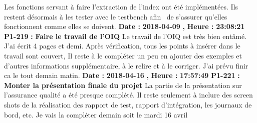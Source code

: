 \documentclass{article}%
\begin{document}
\newline%
%
Les fonctions servant à faire l'extraction de l'index ont été implémentées. Ils restent désormais à les tester avec le testbench afin~ de s'assurer qu'elles fonctionnent comme elles se doivent.\newline%
\newline%
%
\textbf{Date : }%
\textbf{2018{-}04{-}09}%
\textbf{,}%
\textbf{ Heure : }%
\textbf{23:08:21}%
\newline%
%
\textbf{P1{-}219 }%
\textbf{ : }%
\textbf{ Faire le travail de l'OIQ}%
\newline%
\newline%
%
Le travail de l'OIQ est très bien entâmé. J'ai écrit 4 pages et demi. Après vérification, tous les points à insérer dans le travail sont couvert, Il reste à le compléter un peu en ajouter des exemples et d'autres informations supplémentaire, à le relire et à le corriger. J'ai prévu finir ca le tout demain matin.\newline%
\newline%
%
\textbf{Date : }%
\textbf{2018{-}04{-}16}%
\textbf{,}%
\textbf{ Heure : }%
\textbf{17:57:49}%
\newline%
%
\textbf{P1{-}221 }%
\textbf{ : }%
\textbf{ Monter la présentation finale du projet }%
\newline%
\newline%
%
La partie de la présentation sur l'assurance qualité a été presque complété. Il reste seulement à inclure des screen shots de la réalisation des rapport de test, rapport d'intégration, les journaux de bord, etc. Je vais la compléter demain soit le mardi 16 avril\newline%
\newline%
%
\newpage

%
\end{document}
